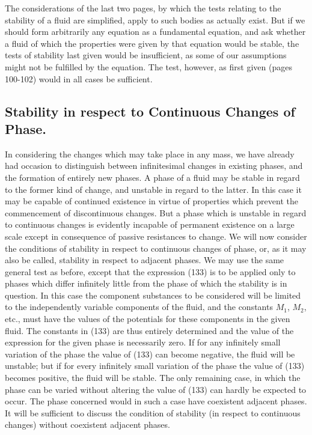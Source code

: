 \documentclass[12pt]{article}
\begin{document}
The considerations of the last two pages, by which the tests relating to the stability of a fluid are simplified, apply to such bodies as actually exist. But if we should form arbitrarily any equation as a fundamental equation, and ask whether a fluid of which the properties were given by that equation would be stable, the tests of stability last given would be insufficient, as some of our assumptions might not be fulfilled by the equation. The test, however, as first given (pages 100-102) would in all cases be sufficient.
\subsection{Stability in respect to Continuous Changes of Phase.}
In considering the changes which may take place in any mass, we have already had occasion to distinguish between infinitesimal changes in existing phases, and the formation of entirely new phases. A phase of a fluid may be stable in regard to the former kind of change, and unstable in regard to the latter. In this case it may be capable of continued existence in virtue of properties which prevent the commencement of discontinuous changes. But a phase which is unstable in regard to continuous changes is evidently incapable of permanent existence on a large scale except in consequence of passive resistances to change. We will now consider the conditions of stability in respect to continuous changes of phase, or, as it may also be called, stability in respect to adjacent phases. We may use the same general test as before, except that the expression (133) is to be applied only to phases which differ infinitely little from the phase of which the stability is in question. In this case the component substances to be considered will be limited to the independently variable components of the fluid, and the constants $M_1$, $M_2$, etc., must have the values of the potentials for these components in the given fluid. The constants in (133) are thus entirely determined and the value of the expression for the given phase is necessarily zero. If for any infinitely small variation of the phase the value of (133) can become negative, the fluid will be unstable; but if for every infinitely small variation of the phase the value of (133) becomes positive, the fluid will be stable. The only remaining case, in which the phase can be varied without altering the value of (133) can hardly be expected to occur. The phase concerned would in such a case have coexistent adjacent phases. It will be sufficient to discuss the condition of stability (in respect to continuous changes) without coexistent adjacent phases.
\end{document}
